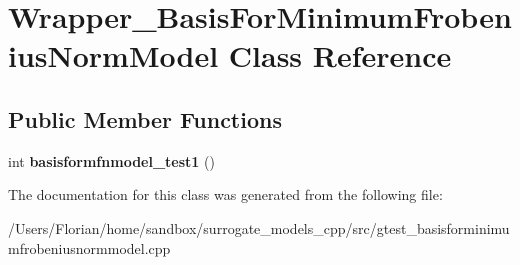 \hypertarget{class_wrapper___basis_for_minimum_frobenius_norm_model}{}\section{Wrapper\+\_\+\+Basis\+For\+Minimum\+Frobenius\+Norm\+Model Class Reference}
\label{class_wrapper___basis_for_minimum_frobenius_norm_model}
\subsection*{Public Member Functions}
\begin{DoxyCompactItemize}
\item 
int {\bfseries basisformfnmodel\+\_\+test1} ()\hypertarget{class_wrapper___basis_for_minimum_frobenius_norm_model_aada905ac9f478c62a23f77f000f46bbd}{}\label{class_wrapper___basis_for_minimum_frobenius_norm_model_aada905ac9f478c62a23f77f000f46bbd}

\end{DoxyCompactItemize}


The documentation for this class was generated from the following file\+:\begin{DoxyCompactItemize}
\item 
/\+Users/\+Florian/home/sandbox/surrogate\+\_\+models\+\_\+cpp/src/gtest\+\_\+basisforminimumfrobeniusnormmodel.\+cpp\end{DoxyCompactItemize}
